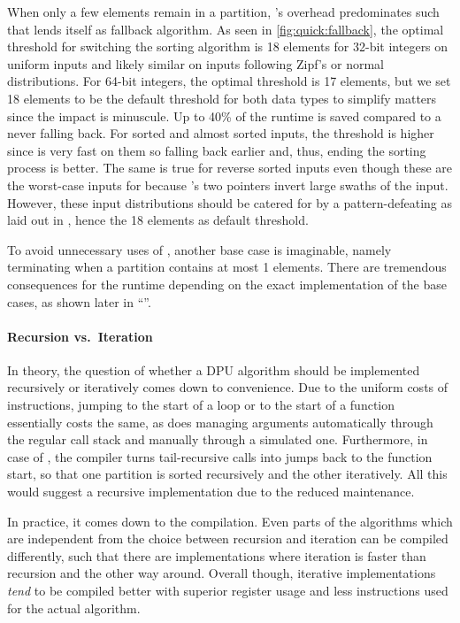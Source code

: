 When only a few elements remain in a partition, \QS{}'s overhead predominates such that \IS{} lends itself as fallback algorithm.
As seen in \cref{fig:quick:fallback}, the optimal threshold for switching the sorting algorithm is 18 elements for 32-bit integers on uniform inputs and likely similar on inputs following Zipf's or normal distributions.
For 64-bit integers, the optimal threshold is 17 elements, but we set 18 elements to be the default threshold for both data types to simplify matters since the impact is minuscule.
Up to 40\% of the runtime is saved compared to a \QS{} never falling back.
For sorted and almost sorted inputs, the threshold is higher since \IS{} is very fast on them so falling back earlier and, thus, ending the sorting process is better.
The same is true for reverse sorted inputs even though these are the worst-case inputs for \IS{} because \QS{}'s two pointers invert large swaths of the input.
However, these input distributions should be catered for by a pattern-defeating \QS{} as laid out in , hence the 18 elements as default threshold.

To avoid unnecessary uses of \IS{}, another base case is imaginable, namely terminating when a partition contains at most 1 elements.
There are tremendous consequences for the runtime depending on the exact implementation of the base cases, as shown later in \enquote{}.


\paragraph{Recursion vs.\ Iteration}
In theory, the question of whether a DPU algorithm should be implemented recursively or iteratively comes down to convenience.
Due to the uniform costs of instructions, jumping to the start of a loop or to the start of a function essentially costs the same, as does managing arguments automatically through the regular call stack and manually through a simulated one.
Furthermore, in case of \QS{}, the compiler turns tail-recursive calls into jumps back to the function start, so that one partition is sorted recursively and the other iteratively.
All this would suggest a recursive implementation due to the reduced maintenance.

In practice, it comes down to the compilation.
Even parts of the algorithms which are independent from the choice between recursion and iteration can be compiled differently, such that there are implementations where iteration is faster than recursion and the other way around.
Overall though, iterative implementations \emph{tend} to be compiled better with superior register usage and less instructions used for the actual \QS{} algorithm.


